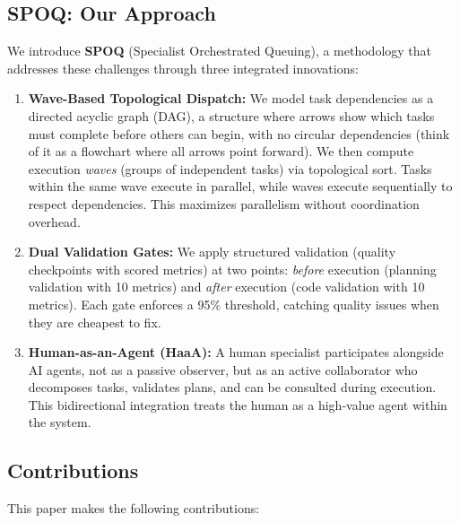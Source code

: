 \subsection{SPOQ: Our Approach}

We introduce \textbf{SPOQ} (Specialist Orchestrated Queuing), a methodology that
addresses these challenges through three integrated innovations:

\begin{enumerate}
    \item \textbf{Wave-Based Topological Dispatch:} We model task dependencies as a
    directed acyclic graph (DAG), a structure where arrows show which tasks must
    complete before others can begin, with no circular dependencies (think of it
    as a flowchart where all arrows point forward). We then compute execution
    \textit{waves} (groups of independent tasks) via topological sort. Tasks within
    the same wave execute in parallel, while waves execute sequentially to respect
    dependencies. This maximizes parallelism without coordination overhead.

    \item \textbf{Dual Validation Gates:} We apply structured validation (quality
    checkpoints with scored metrics) at two points: \textit{before} execution
    (planning validation with 10 metrics) and \textit{after} execution (code
    validation with 10 metrics). Each gate enforces a 95\% threshold, catching
    quality issues when they are cheapest to fix.

    \item \textbf{Human-as-an-Agent (HaaA):} A human specialist participates alongside
    AI agents, not as a passive observer, but as an active collaborator who
    decomposes tasks, validates plans, and can be consulted during execution.
    This bidirectional integration treats the human as a high-value agent within
    the system.
\end{enumerate}

\subsection{Contributions}

This paper makes the following contributions:

